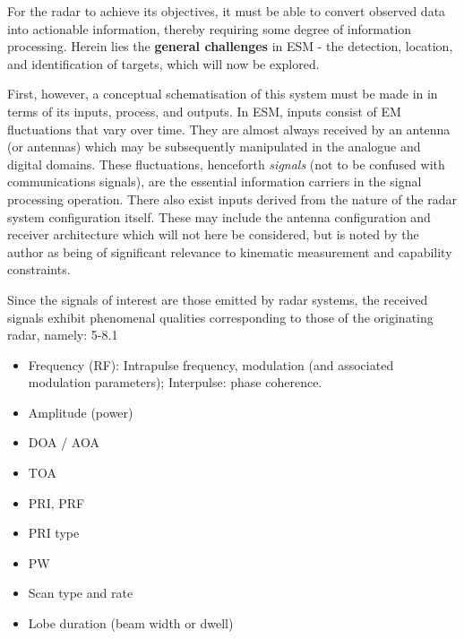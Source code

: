 

For the radar to achieve its objectives, it must be able to convert observed data into actionable information, thereby requiring some degree of information processing. 
Herein lies the \textbf{general challenges} in \ac{ESM} - the detection, location, and identification of targets, which will now be explored. %

First, however, a conceptual schematisation of this system must be made in in terms of its inputs, process, and outputs. In \ac{ESM}, inputs consist of EM fluctuations that vary over time. They are almost always received by an antenna (or antennas) which may be subsequently manipulated in the analogue and digital domains. These fluctuations, henceforth \textit{signals} (not to be confused with communications signals), are the essential information carriers in the signal processing operation. There also exist inputs derived from the nature of the radar system configuration itself. These may include the antenna configuration and receiver architecture which will not here be considered, but is noted by the author as being of significant relevance to kinematic measurement and capability constraints.

Since the signals of interest are those emitted by radar systems, the received signals exhibit phenomenal qualities corresponding to those of the originating radar, namely: \cite{avionics_department_electronic_2013} 5-8.1
\begin{itemize}
    \item Frequency (\ac{RF}): Intrapulse frequency, modulation (and associated modulation parameters); Interpulse: phase coherence.
    \item Amplitude (power)
    \item \ac{DOA} / \ac{AOA}
    \item \ac{TOA}
    \item \ac{PRI}, \ac{PRF}
    \item \ac{PRI} type
    \item \ac{PW}
    \item Scan type and rate
    \item Lobe duration (beam width or dwell)
\end{itemize}

